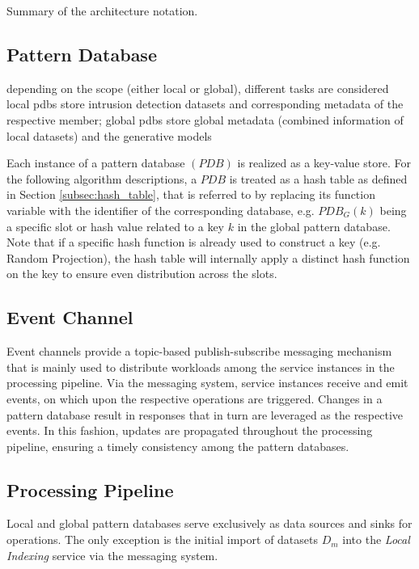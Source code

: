     \begin{table}[b]
        \centering
        
        \caption{Summary of the architecture notation.}
    \end{table}

\subsection{Pattern Database} \label{subsec:pattern_database}

depending on the scope (either local or global), different tasks are considered
local pdbs store intrusion detection datasets and corresponding metadata of the respective member; 
global pdbs store global metadata (combined information of local datasets) and the generative models


Each instance of a pattern database $(PDB)$ is realized as a key-value store. For the following algorithm descriptions, a $PDB$ is treated as a hash table as defined in Section \ref{subsec:hash_table}, that is referred to by replacing its function variable with the identifier of the corresponding database, e.g. $PDB_G(k)$ being a specific slot or hash value related to a key $k$ in the global pattern database. Note that if a specific hash function is already used to construct a key (e.g. Random Projection), the hash table will internally apply a distinct hash function on the key to ensure even distribution across the slots.

\subsection{Event Channel} \label{subsec:event_channel}
Event channels provide a topic-based publish-subscribe messaging mechanism that is mainly used to distribute workloads among the service instances in the processing pipeline. Via the messaging system, service instances receive and emit events, on which upon the respective operations are triggered. Changes in a pattern database result in responses that in turn are leveraged as the respective events. In this fashion, updates are propagated throughout the processing pipeline, ensuring a timely consistency among the pattern databases.

\subsection{Processing Pipeline} \label{subsec:processing_pipeline} 
Local and global pattern databases serve exclusively as data sources and sinks for operations. The only exception is the initial import of datasets $D_m$ into the \textit{Local Indexing} service via the messaging system.